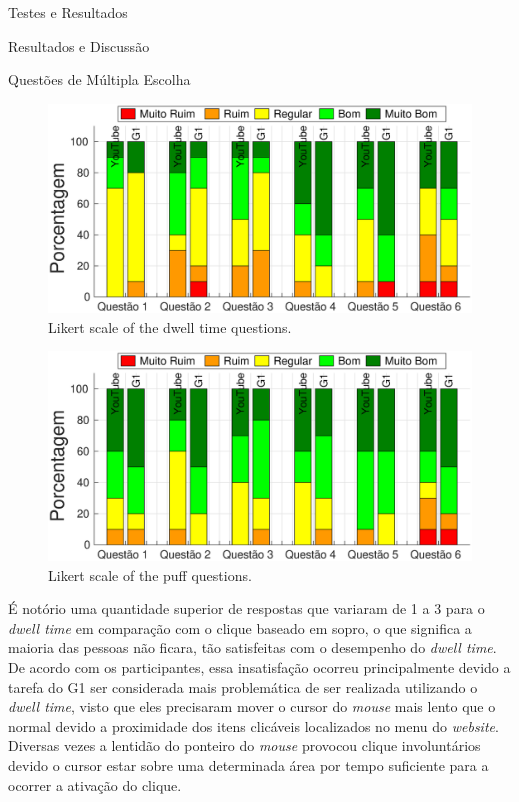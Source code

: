 \begin{chapter}{Testes e Resultados}
\begin{section}{Resultados e Discussão}
\begin{subsection}{Questões de Múltipla Escolha}
\begin{figure}[H]
	\centering
	\includegraphics[width=1.0\linewidth]{fig/DwellQuestions}
	\caption{Likert scale of the dwell time questions.} 
	\label{fig:DwellQuestions}
\end{figure}

\begin{figure}[H]
	\centering
	\includegraphics[width=1.0\linewidth]{fig/PuffQuestions}
	\caption{Likert scale of the puff questions.}
	\label{fig:PuffQuestions}
\end{figure}

É notório uma quantidade superior de respostas que variaram de 1 a 3 para o
\textit{dwell time} em comparação com o clique baseado em sopro, o  que
significa a maioria das pessoas não ficara, tão satisfeitas com o desempenho do
\textit{dwell time}. De acordo com os participantes, essa insatisfação ocorreu
principalmente devido a tarefa do G1 ser considerada mais problemática de ser
realizada utilizando o \textit{dwell time}, visto que eles precisaram mover o
cursor do \textit{mouse} mais lento que o normal devido a proximidade dos itens
clicáveis localizados no menu do \textit{website}. Diversas vezes a lentidão do
ponteiro do \textit{mouse} provocou clique involuntários devido o cursor estar
sobre uma determinada área por tempo suficiente para a ocorrer a ativação do 
clique.


\end{subsection}
\end{section}
\end{chapter}
